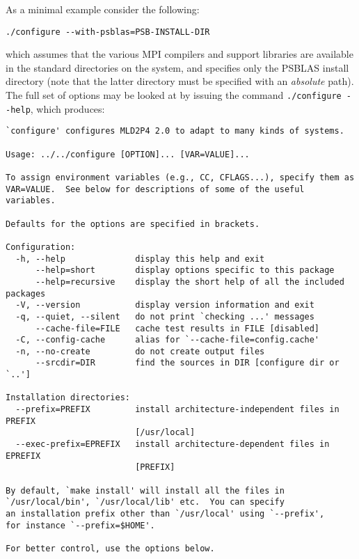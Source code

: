 As a minimal example consider the following:
\begin{verbatim}
./configure --with-psblas=PSB-INSTALL-DIR
\end{verbatim}
which assumes that the various MPI compilers and support libraries are
available in the standard directories on the system, and specifies
only the PSBLAS install  directory (note that the latter directory must
be specified with an {\em absolute} path).
The full set of options may be looked at by issuing the command
\verb|./configure --help|, which produces:
\begin{verbatim}
`configure' configures MLD2P4 2.0 to adapt to many kinds of systems.

Usage: ../../configure [OPTION]... [VAR=VALUE]...

To assign environment variables (e.g., CC, CFLAGS...), specify them as
VAR=VALUE.  See below for descriptions of some of the useful variables.

Defaults for the options are specified in brackets.

Configuration:
  -h, --help              display this help and exit
      --help=short        display options specific to this package
      --help=recursive    display the short help of all the included packages
  -V, --version           display version information and exit
  -q, --quiet, --silent   do not print `checking ...' messages
      --cache-file=FILE   cache test results in FILE [disabled]
  -C, --config-cache      alias for `--cache-file=config.cache'
  -n, --no-create         do not create output files
      --srcdir=DIR        find the sources in DIR [configure dir or `..']

Installation directories:
  --prefix=PREFIX         install architecture-independent files in PREFIX
                          [/usr/local]
  --exec-prefix=EPREFIX   install architecture-dependent files in EPREFIX
                          [PREFIX]

By default, `make install' will install all the files in
`/usr/local/bin', `/usr/local/lib' etc.  You can specify
an installation prefix other than `/usr/local' using `--prefix',
for instance `--prefix=$HOME'.

For better control, use the options below.


\end{verbatim}
